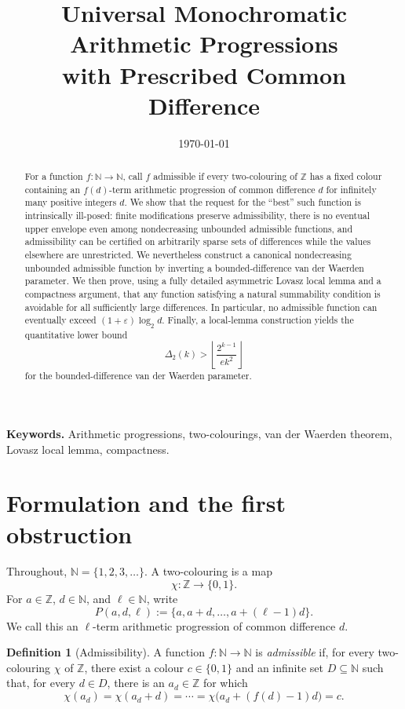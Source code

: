 \documentclass[11pt]{article}
\title{Universal Monochromatic Arithmetic Progressions\\with Prescribed Common Difference}
\author{}
\date{\today}
\theoremstyle{definition}
\newtheorem{definition}[theorem]{Definition}
\theoremstyle{remark}
\newcommand{\N}{\mathbb N}
\newcommand{\Z}{\mathbb Z}
\newcommand{\col}{\chi}
\begin{document}
\maketitle

\begin{abstract}
For a function $f\colon\N\to\N$, call $f$ admissible if every two-colouring of $\Z$ has a fixed colour containing an $f(d)$-term arithmetic progression of common difference $d$ for infinitely many positive integers $d$. We show that the request for the ``best'' such function is intrinsically ill-posed: finite modifications preserve admissibility, there is no eventual upper envelope even among nondecreasing unbounded admissible functions, and admissibility can be certified on arbitrarily sparse sets of differences while the values elsewhere are unrestricted. We nevertheless construct a canonical nondecreasing unbounded admissible function by inverting a bounded-difference van der Waerden parameter. We then prove, using a fully detailed asymmetric Lovasz local lemma and a compactness argument, that any function satisfying a natural summability condition is avoidable for all sufficiently large differences. In particular, no admissible function can eventually exceed $(1+\varepsilon)\log_2 d$. Finally, a local-lemma construction yields the quantitative lower bound
\[
\Delta_2(k)>\left\lfloor\frac{2^{k-1}}{e k^2}\right\rfloor
\]
for the bounded-difference van der Waerden parameter.
\end{abstract}

\medskip
\noindent\textbf{Keywords.} Arithmetic progressions, two-colourings, van der Waerden theorem, Lovasz local lemma, compactness.

\section{Formulation and the first obstruction}

Throughout, $\N=\{1,2,3,\ldots\}$. A two-colouring is a map
\[
\col\colon\Z\longrightarrow\{0,1\}.
\]
For $a\in\Z$, $d\in\N$, and $\ell\in\N$, write
\[
P(a,d,\ell):=\{a,a+d,\ldots,a+(\ell-1)d\}.
\]
We call this an $\ell$-term arithmetic progression of common difference $d$.

\begin{definition}[Admissibility]\label{def:admissible}
A function $f\colon\N\to\N$ is \emph{admissible} if, for every two-colouring $\col$ of $\Z$, there exist a colour $c\in\{0,1\}$ and an infinite set $D\subseteq\N$ such that, for every $d\in D$, there is an $a_d\in\Z$ for which
\[
\col(a_d)=\col(a_d+d)=\cdots=\col\bigl(a_d+(f(d)-1)d\bigr)=c.
\]
\end{definition}
\end{document}
